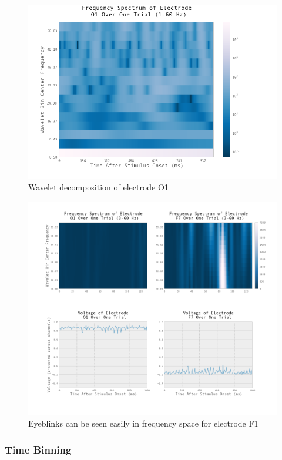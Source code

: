 \documentclass[11pt]{report}
\begin{document}
\begin{figure}[t]
\centering
\includegraphics[width=6in]{wavelet_transform_O1_halfto60}
\caption{Wavelet decomposition of electrode O1}
\end{figure}

\begin{figure}[t]
\centering
\includegraphics[width=5.5in]{eyebink_wavelets_compare}
\caption{Eyeblinks can be seen easily in frequency space for electrode F1}
\end{figure}

\subsubsection{Time Binning}
\end{document}
